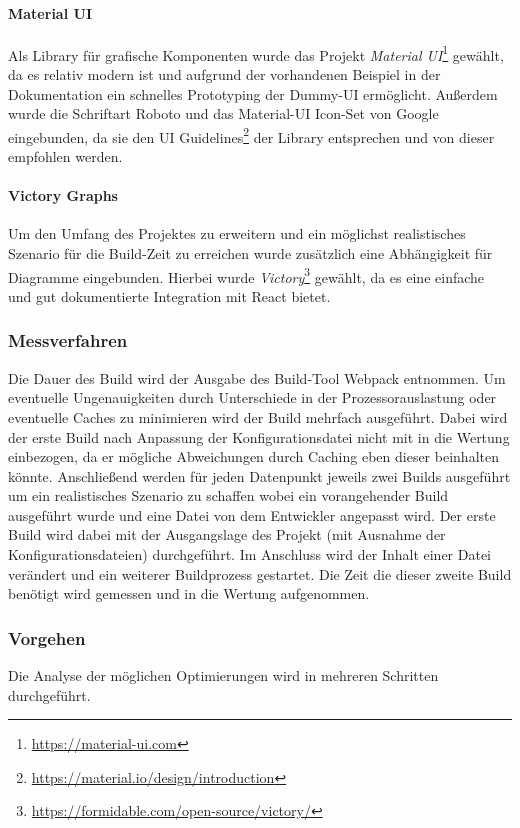 \documentclass[11pt]{article}
\begin{document}
				\paragraph{Material UI} Als Library für grafische Komponenten wurde das Projekt \emph{Material UI}\footnote{\url{https://material-ui.com}} gewählt, da es relativ modern ist und aufgrund der vorhandenen Beispiel in der Dokumentation ein schnelles Prototyping der Dummy-UI ermöglicht. Außerdem wurde die Schriftart Roboto und das Material-UI Icon-Set von Google eingebunden, da sie den UI Guidelines\footnote{\url{https://material.io/design/introduction}} der Library entsprechen und von dieser empfohlen werden.
				
				\paragraph{Victory Graphs} Um den Umfang des Projektes zu erweitern und ein möglichst realistisches Szenario für die Build-Zeit zu erreichen wurde zusätzlich eine Abhängigkeit für Diagramme eingebunden. Hierbei wurde \emph{Victory}\footnote{\url{https://formidable.com/open-source/victory/}} gewählt, da es eine einfache und gut dokumentierte Integration mit React bietet.
				
			\subsubsection{Messverfahren}
				Die Dauer des Build wird der Ausgabe des Build-Tool Webpack entnommen. Um eventuelle Ungenauigkeiten durch Unterschiede in der Prozessorauslastung oder eventuelle Caches zu minimieren wird der Build mehrfach ausgeführt. Dabei wird der erste Build nach Anpassung der Konfigurationsdatei nicht mit in die Wertung einbezogen, da er mögliche Abweichungen durch Caching eben dieser beinhalten könnte. Anschließend werden für jeden Datenpunkt jeweils zwei Builds ausgeführt um ein realistisches Szenario zu schaffen wobei ein vorangehender Build ausgeführt wurde und eine Datei von dem Entwickler angepasst wird. Der erste Build wird dabei mit der Ausgangslage des Projekt (mit Ausnahme der Konfigurationsdateien) durchgeführt. Im Anschluss wird der Inhalt einer Datei verändert und ein weiterer Buildprozess gestartet. Die Zeit die dieser zweite Build benötigt wird gemessen und in die Wertung aufgenommen.
				
			\subsubsection{Vorgehen}
				Die Analyse der möglichen Optimierungen wird in mehreren Schritten durchgeführt.
\end{document}
